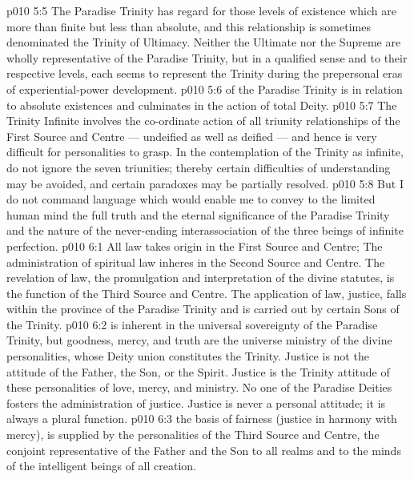 \vs p010 5:5 \bibnobreakspace {} The Paradise Trinity has regard for those levels of existence which are more than finite but less than absolute, and this relationship is sometimes denominated the Trinity of Ultimacy. Neither the Ultimate nor the Supreme are wholly representative of the Paradise Trinity, but in a qualified sense and to their respective levels, each seems to represent the Trinity during the prepersonal eras of experiential\hyp{}power development.
\vs p010 5:6 \bibnobreakspace {} of the Paradise Trinity is in relation to absolute existences and culminates in the action of total Deity.
\vs p010 5:7 \pc The Trinity Infinite involves the co\hyp{}ordinate action of all triunity relationships of the First Source and Centre --- undeified as well as deified --- and hence is very difficult for personalities to grasp. In the contemplation of the Trinity as infinite, do not ignore the seven triunities; thereby certain difficulties of understanding may be avoided, and certain paradoxes may be partially resolved.
\vs p010 5:8 \pc But I do not command language which would enable me to convey to the limited human mind the full truth and the eternal significance of the Paradise Trinity and the nature of the never\hyp{}ending interassociation of the three beings of infinite perfection.
\vs p010 6:1 All law takes origin in the First Source and Centre;  The administration of spiritual law inheres in the Second Source and Centre. The revelation of law, the promulgation and interpretation of the divine statutes, is the function of the Third Source and Centre. The application of law, justice, falls within the province of the Paradise Trinity and is carried out by certain Sons of the Trinity.
\vs p010 6:2 \pc {} is inherent in the universal sovereignty of the Paradise Trinity, but goodness, mercy, and truth are the universe ministry of the divine personalities, whose Deity union constitutes the Trinity. Justice is not the attitude of the Father, the Son, or the Spirit. Justice is the Trinity attitude of these personalities of love, mercy, and ministry. No one of the Paradise Deities fosters the administration of justice. Justice is never a personal attitude; it is always a plural function.
\vs p010 6:3 \pc {} the basis of fairness (justice in harmony with mercy), is supplied by the personalities of the Third Source and Centre, the conjoint representative of the Father and the Son to all realms and to the minds of the intelligent beings of all creation.
